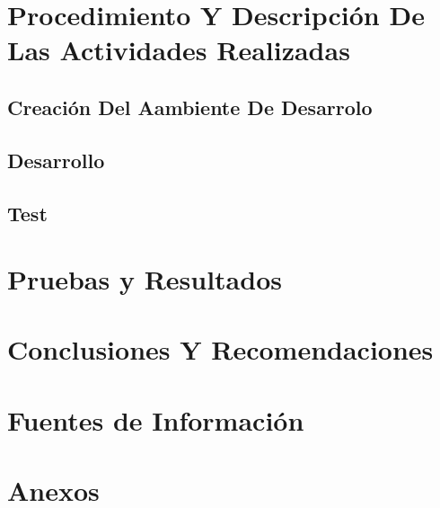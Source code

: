 \documentclass[a4paper,12pt]{report}
\begin{document}
		\chapter {Procedimiento Y Descripción De Las Actividades Realizadas}
			
			
			\section {Creación Del Aambiente De Desarrolo}
				
				
			\section {Desarrollo}
				
				
			\section {Test }
				
			
		
		\chapter {Pruebas y Resultados}
		
		\chapter {Conclusiones Y Recomendaciones}
		
		\chapter {Fuentes de Información}
			
			
		\chapter {Anexos}
\end{document}

